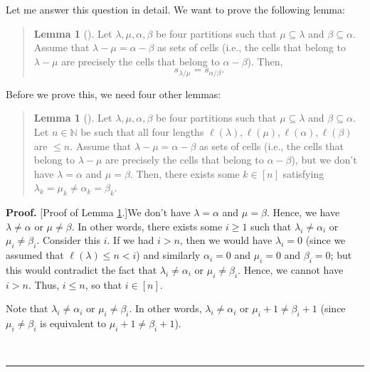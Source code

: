 \documentclass[numbers=enddot,12pt,final,onecolumn,notitlepage]{scrartcl}%
\newenvironment{statement}{\begin{quote}}{\end{quote}}
\theoremstyle{definition}
\newtheorem{lem}[theo]{Lemma}
\newenvironment{lemmain}[1][]
{\begin{statement}\begin{lem}[#1]}
{\end{lem}\end{statement}}
\newenvironment{proof}[1][Proof]{\noindent\textbf{#1.} }{\ \rule{0.5em}{0.5em}}
\newenvironment{lemmain}[1][Proof]{\noindent\textbf{#1.} }{\ \rule{0.5em}{0.5em}}
\begin{document}
\begin{enumerate}
Let me answer this question in detail. We want to prove the following lemma:

\begin{lemmain}
\label{lem.9v.shape}Let $\lambda,\mu,\alpha,\beta$ be four partitions such
that $\mu\subseteq\lambda$ and $\beta\subseteq\alpha$. Assume that
$\lambda-\mu=\alpha-\beta$ as sets of cells (i.e., the cells that belong to
$\lambda-\mu$ are precisely the cells that belong to $\alpha-\beta$). Then,%
\[
s_{\lambda/\mu}=s_{\alpha/\beta}.
\]

\end{lemmain}

Before we prove this, we need four other lemmas:

\begin{lemmain}
\label{lem.9v.shape1}Let $\lambda,\mu,\alpha,\beta$ be four partitions such
that $\mu\subseteq\lambda$ and $\beta\subseteq\alpha$. Let $n\in\mathbb{N}$ be
such that all four lengths $\ell\left(  \lambda\right)  ,\ell\left(
\mu\right)  ,\ell\left(  \alpha\right)  ,\ell\left(  \beta\right)  $ are $\leq
n$. Assume that $\lambda-\mu=\alpha-\beta$ as sets of cells (i.e., the cells
that belong to $\lambda-\mu$ are precisely the cells that belong to
$\alpha-\beta$), but we don't have $\lambda=\alpha$ and $\mu=\beta$. Then,
there exists some $k\in\left[  n\right]  $ satisfying $\lambda_{k}=\mu_{k}%
\neq\alpha_{k}=\beta_{k}$.
\end{lemmain}

\begin{proof}
[Proof of Lemma \ref{lem.9v.shape1}.]We don't have $\lambda=\alpha$ and
$\mu=\beta$. Hence, we have $\lambda\neq\alpha$ or $\mu\neq\beta$. In other
words, there exists some $i\geq1$ such that $\lambda_{i}\neq\alpha_{i}$ or
$\mu_{i}\neq\beta_{i}$. Consider this $i$. If we had $i>n$, then we would have
$\lambda_{i}=0$ (since we assumed that $\ell\left(  \lambda\right)  \leq n<i$)
and similarly $\alpha_{i}=0$ and $\mu_{i}=0$ and $\beta_{i}=0$; but this would
contradict the fact that $\lambda_{i}\neq\alpha_{i}$ or $\mu_{i}\neq\beta_{i}%
$. Hence, we cannot have $i>n$. Thus, $i\leq n$, so that $i\in\left[
n\right]  $.

Note that $\lambda_{i}\neq\alpha_{i}$ or $\mu_{i}\neq\beta_{i}$. In other
words, $\lambda_{i}\neq\alpha_{i}$ or $\mu_{i}+1\neq\beta_{i}+1$ (since
$\mu_{i}\neq\beta_{i}$ is equivalent to $\mu_{i}+1\neq\beta_{i}+1$).


\end{proof}
\end{enumerate}
\end{document}
